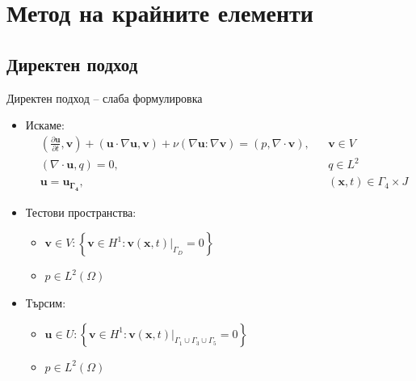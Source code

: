 \documentclass{beamer}
\begin{document}
\section{Метод на крайните елементи}






    \subsection{Директен подход}
    \begin{frame}{Директен подход -- слаба формулировка}
    \begin{itemize}[<+->]
		\item Искаме:
		\begin{align*}
  			&\left(\frac{\partial\mathbf{u}}{\partial t}, \mathbf{v}\right)
  			+ (\mathbf{u}\cdot\nabla\mathbf{u}, \mathbf{v}) + \nu(\nabla\mathbf{u} : \nabla\mathbf{v}) =
  			(p, \nabla \cdot \mathbf{v}), &&\mathbf{v} \in V \\
  			&(\nabla\cdot\mathbf{u}, q) = 0, &&q \in L^2 \\
  			&\mathbf{u} = \mathbf{u_{\Gamma_4}}, &&\left(\mathbf{x}, t\right) \in \Gamma_4 \times J  
		\end{align*}
		\item Тестови пространства:
			\begin{itemize}
    				\item $\mathbf{v} \in V : \left\{\mathbf{v} \in H^1 : \mathbf{v}(\mathbf{x}, t)|_{\Gamma_D} = 0 \right\}$
    				\item $p \in L^2(\Omega)$
    			\end{itemize}
    		\item Търсим:
    			\begin{itemize}
    				\item $\mathbf{u} \in U : \left\{\mathbf{v} \in H^1 : \mathbf{v}(\mathbf{x}, t)|_{\Gamma_1 \cup \Gamma_3 \cup \Gamma_5} = 0\right\}$
    				\item $p \in L^2(\Omega)$
    		\end{itemize}
    \end{itemize}

    \end{frame}
\iffalse
\end{document}
